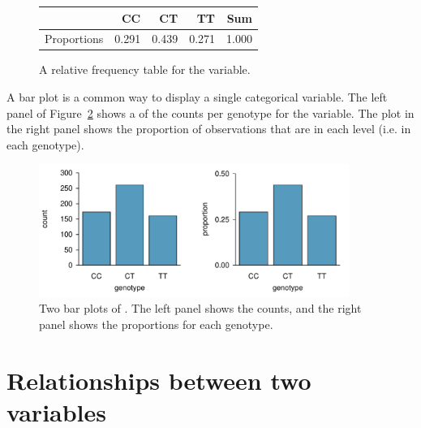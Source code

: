 \begin{figure}[ht]
	\centering
	\begin{tabular}{rrrrr}
		\hline
		& CC & CT & TT & Sum \\ 
		\hline
		Proportions & 0.291 & 0.439 & 0.271 & 1.000 \\ 
		\hline
	\end{tabular}
	\caption{A relative frequency table for the  variable.} 
	\label{famussRelFrequencyTable}
\end{figure}


A bar plot is a common way to display a single categorical variable. The left panel of Figure~\ref{famussBarPlot} shows a  of the counts per genotype for the  variable. The plot in the right panel shows the proportion of observations that are in each level (i.e. in each genotype).

\begin{figure}[h]
	\centering
	\includegraphics[width=0.9\textwidth]{ch_intro_to_data_oi_biostat/figures/famussBarPlot/famussBarPlot}
	\caption{Two bar plots of . The left panel shows the counts, and the right panel shows the proportions for each genotype.}
	\label{famussBarPlot}
\end{figure}


\section{Relationships between two variables}
\label{relationshipsBetweenTwoVariables}

